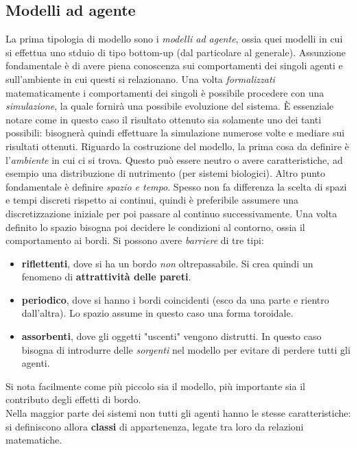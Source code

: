 \documentclass[12pt, a4paper]{book}
\theoremstyle{theorem}
\begin{document}
		\subsection{Modelli ad agente}
			La prima tipologia di modello sono i \emph{modelli ad agente}, ossia quei modelli in cui si effettua uno stduio di tipo bottom-up (dal particolare al generale).
			Assunzione fondamentale è di avere piena conoscenza sui comportamenti dei singoli agenti e sull'ambiente in cui questi si relazionano.
			Una volta \emph{formalizzati} matematicamente i comportamenti dei singoli è possibile procedere con una \emph{simulazione}, la quale fornirà una possibile evoluzione del sistema.
			È essenziale notare come in questo caso il risultato ottenuto sia solamente uno dei tanti possibili: bisognerà quindi effettuare la simulazione numerose volte e mediare sui risultati ottenuti.
			Riguardo la costruzione del modello, la prima cosa da definire è l'\textit{ambiente} in cui ci si trova. 
			Questo può essere neutro o avere caratteristiche, ad esempio una distribuzione di nutrimento (per sistemi biologici).
			Altro punto fondamentale è definire \textit{spazio e tempo}. 
			Spesso non fa differenza la scelta di spazi e tempi discreti rispetto ai continui, quindi è preferibile assumere una discretizzazione iniziale per poi passare al continuo successivamente.
			Una volta definito lo spazio bisogna poi decidere le condizioni al contorno, ossia il comportamento ai bordi. 
			Si possono avere \textit{barriere} di tre tipi:
			\begin{itemize}
				\item \textbf{riflettenti}, dove si ha un bordo \textit{non} oltrepassabile. Si crea quindi un fenomeno di \textbf{attrattività delle pareti}.
				\item \textbf{periodico}, dove si hanno i bordi coincidenti (esco da una parte e rientro dall'altra). Lo spazio assume in questo caso una forma toroidale.
				\item \textbf{assorbenti}, dove gli oggetti "uscenti" vengono distrutti. In questo caso bisogna di introdurre delle \textit{sorgenti} nel modello per evitare di perdere tutti gli agenti.
			\end{itemize}
			Si nota facilmente come più piccolo sia il modello, più importante sia il contributo degli effetti di bordo.\\
			Nella maggior parte dei sistemi non tutti gli agenti hanno le stesse caratteristiche: si definiscono allora \textbf{classi} di appartenenza, legate tra loro da relazioni matematiche.
\end{document}
